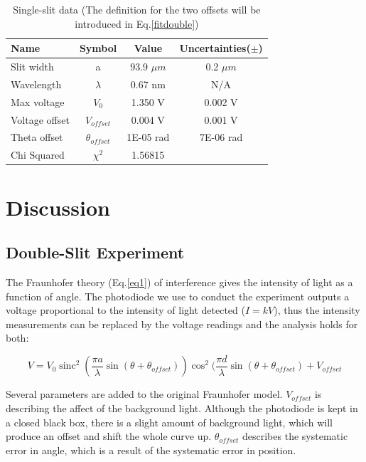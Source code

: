\documentclass[prb,preprint]{revtex4-1}
\DeclareMathOperator{\sinc}{sinc}
\begin{document}
\begin{table}[h!!!!!!]
\centering
\caption{Single-slit data (The definition for the two offsets will be introduced in Eq.\ref{fitdouble})}
\begin{ruledtabular}
\begin{tabular}{ l c c c}
Name & Symbol & Value & Uncertainties($\pm$)\\
\hline
Slit width & a & 93.9 $\mu m$ & 0.2 $\mu m$\\
Wavelength & $\lambda$ & 0.67 nm & N/A \\
Max voltage & $V_0$ & 1.350 V & 0.002 V\\
Voltage offset & $V_{offset}$ &  0.004 V & 0.001 V\\
Theta offset &$ \theta_{offset}$ & 1E-05 rad & 7E-06 rad \\

\hline
Chi Squared & $\chi^2$ & 1.56815 &
\end{tabular}
\end{ruledtabular}
\label{data}
\end{table}

\section{Discussion}

\subsection{Double-Slit Experiment}

The Fraunhofer theory (Eq.\ref{eq1}) of interference gives the intensity of light as a function of angle. The photodiode we use to conduct the experiment outputs a voltage proportional to the intensity of light detected ($I = kV$), thus the intensity measurements can be replaced by the voltage readings and the analysis holds for both:

\begin{equation}
V=V_0 \sinc^2( \frac{\pi a}{\lambda} \sin (\theta+\theta_{offset}))  \cos^2(\frac{\pi d}{\lambda} \sin (\theta+\theta_{offset}) + V_{offset}
\label{fitdouble}
\end{equation}

Several parameters are added to the original Fraunhofer model. $V_{offset}$ is describing the affect of the background light. Although the photodiode is kept in a closed black box, there is a slight amount of background light, which will produce an offset and shift the whole curve up. $\theta_{offset}$ describes the systematic error in angle, which is a result of the systematic error in position.\\
\end{document}
